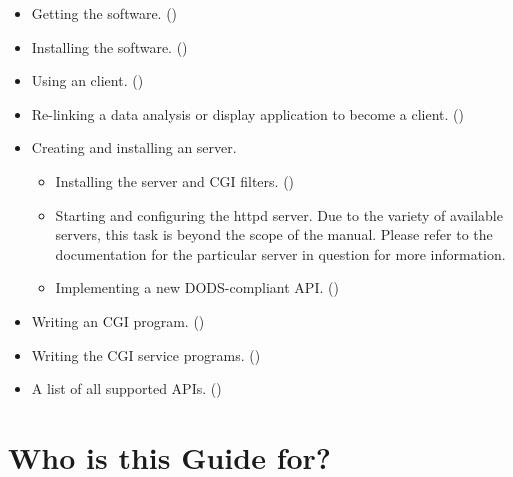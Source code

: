 \begin{itemize}

\item Getting the \opendap software. ()

\item Installing the \opendap software. ()

\item Using an \opendap client. ()

\item Re-linking a data analysis or display application to become a
  \opendap client. ()


\item Creating and installing an \opendap server.

  \begin{itemize}
    
  \item Installing the \opendap server and CGI filters.
    ()

  \item Starting and configuring the httpd server. Due to the variety
    of available servers, this task is beyond the scope of the manual.
    Please refer to the documentation for the particular server in question
    for more information.

  \item Implementing a new DODS-compliant API. (\OPDapi)

  \end{itemize}

\item Writing an \opendap CGI program. (\OPDapi )

\item Writing the CGI service programs. (\OPDapi )

\item A list of all supported APIs. ()

\end{itemize}


\section{Who is this Guide for?}
\label{pref,who}

